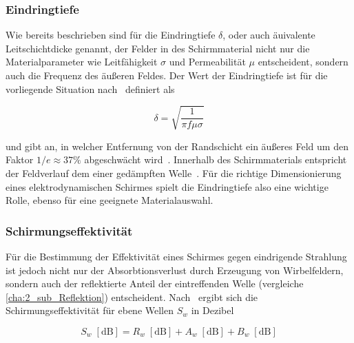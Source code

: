 \subsubsection{Eindringtiefe}\label{cha:2_subsub_Eindringtiefe}

Wie bereits beschrieben sind für die Eindringtiefe $\delta$, oder auch äuivalente Leitschichtdicke genannt, der Felder in des Schirmmaterial nicht nur die Materialparameter wie Leitfähigkeit $\sigma$ und Permeabilität $\mu$ entscheident, sondern auch die Frequenz des äußeren Feldes. Der Wert der Eindringtiefe ist für die vorliegende Situation nach~\cite{Taschenbuch_HF-Technik} definiert als

\begin{equation}
    \delta = \sqrt{\frac{1}{\pi f \mu \sigma}}
    \label{eq:2_Eindringtiefe}
\end{equation}

und gibt an, in welcher Entfernung von der Randschicht ein äußeres Feld um den Faktor $1/e \approx 37 \si{\percent}$ abgeschwächt wird~\cite{Taschenbuch_HF-Technik}. Innerhalb des Schirmmaterials entspricht der Feldverlauf dem einer gedämpften Welle~\cite{EM_Schirmung}. Für die richtige Dimensionierung eines elektrodynamischen Schirmes spielt die Eindringtiefe also eine wichtige Rolle, ebenso für eine geeignete Materialauswahl.


\subsubsection{Schirmungseffektivität}\label{cha:2_subsub_Schirmungseffektivitaet}

Für die Bestimmung der Effektivität eines Schirmes gegen eindrigende Strahlung ist jedoch nicht nur der Absorbtionsverlust durch Erzeugung von Wirbelfeldern, sondern auch der reflektierte Anteil der eintreffenden Welle (vergleiche \Abschnitt\ref{cha:2_sub_Reflektion}) entscheident. Nach~\cite{Problems_in_shielding_electronic_equiptment, NASA_SP-3067} ergibt sich die Schirmungseffektivität für ebene Wellen $S_w$ in Dezibel

\begin{equation}
    S_w \; \left[\text{dB}\right] = R_w \; \left[\text{dB}\right] + A_w \; \left[\text{dB}\right] + B_w \; \left[\text{dB}\right]
    \label{eq:2_Schirmungseffektivitaet}
\end{equation}

